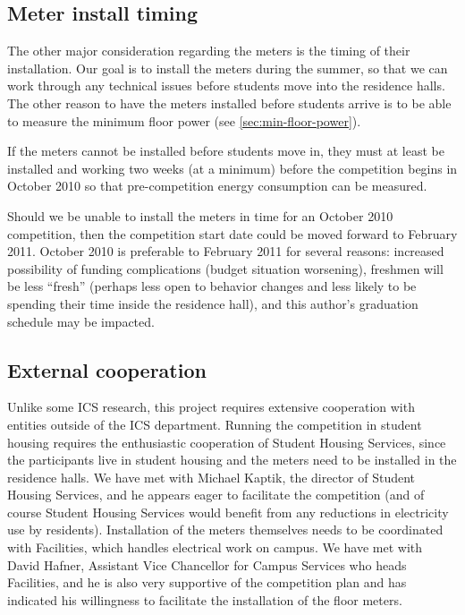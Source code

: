 \subsection{Meter install timing}

The other major consideration regarding the meters is the timing of their installation. Our goal is to install the meters during the summer, so that we can work through any technical issues before students move into the residence halls. The other reason to have the meters installed before students arrive is to be able to measure the minimum floor power (see \autoref{sec:min-floor-power}).

If the meters cannot be installed before students move in, they must at least be installed and working two weeks (at a minimum) before the competition begins in October 2010 so that pre-competition energy consumption can be measured.

Should we be unable to install the meters in time for an October 2010 competition, then the competition start date could be moved forward to February 2011. October 2010 is preferable to February 2011 for several reasons: increased possibility of funding complications (budget situation worsening), freshmen will be less ``fresh'' (perhaps less open to behavior changes and less likely to be spending their time inside the residence hall), and this author's graduation schedule may be impacted.

\subsection{External cooperation}
\label{sec:external-cooperation}
Unlike some ICS research, this project requires extensive cooperation with entities outside of the ICS department. Running the competition in student housing requires the enthusiastic cooperation of Student Housing Services, since the participants live in student housing and the meters need to be installed in the residence halls. We have met with Michael Kaptik, the director of Student Housing Services, and he appears eager to facilitate the competition (and of course Student Housing Services would benefit from any reductions in electricity use by residents). Installation of the meters themselves needs to be coordinated with Facilities, which handles electrical work on campus. We have met with David Hafner, Assistant Vice Chancellor for Campus Services who heads Facilities, and he is also very supportive of the competition plan and has indicated his willingness to facilitate the installation of the floor meters.


